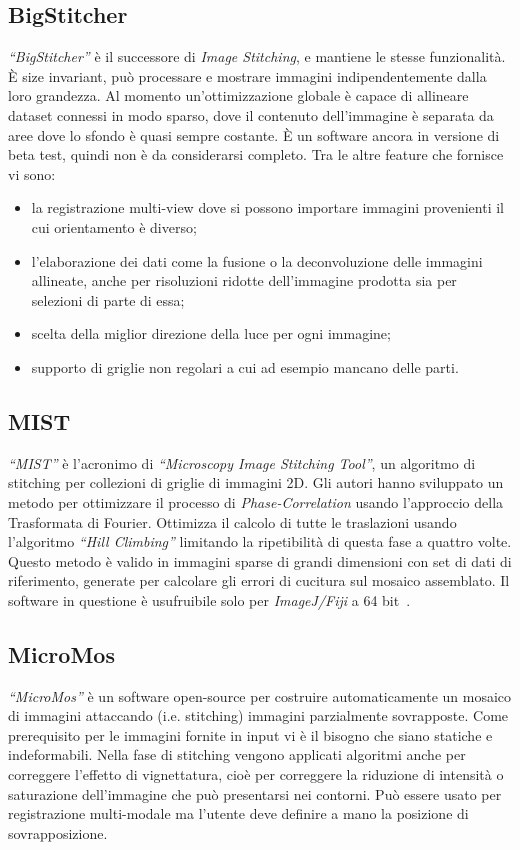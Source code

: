 \subsection{BigStitcher}
\noindent \textit{``BigStitcher''} è il successore di \textit{Image Stitching}, e mantiene le stesse funzionalità. È size invariant, può processare e mostrare immagini indipendentemente dalla loro grandezza. Al momento un'ottimizzazione globale è capace di allineare dataset connessi in modo sparso, dove il contenuto dell'immagine è separata da aree dove lo sfondo è quasi sempre costante. È un software ancora in versione di beta test, quindi non è da considerarsi completo. Tra le altre feature che fornisce vi sono:
\begin{itemize}
    \item la registrazione multi-view dove si possono importare immagini provenienti il cui orientamento è diverso;
    \item l'elaborazione dei dati come la fusione o la deconvoluzione delle immagini allineate, anche per risoluzioni ridotte dell'immagine prodotta sia per selezioni di parte di essa;
    \item scelta della miglior direzione della luce per ogni immagine;
    \item supporto di griglie non regolari a cui ad esempio mancano delle parti.
\end{itemize}

\subsection{MIST}
\noindent \textit{``MIST''} è l'acronimo di \textit{``Microscopy Image Stitching Tool''}, un algoritmo di stitching per collezioni di griglie di immagini 2D. Gli autori hanno sviluppato un metodo per ottimizzare il processo di \textit{Phase-Correlation} usando l'approccio della Trasformata di Fourier. Ottimizza il calcolo di tutte le traslazioni usando l'algoritmo \textit{``Hill Climbing''} limitando la ripetibilità di questa fase a quattro volte. Questo metodo è valido in immagini sparse di grandi dimensioni con set di dati di riferimento, generate per calcolare gli errori di cucitura sul mosaico assemblato. Il software in questione è usufruibile solo per \textit{ImageJ/Fiji} a 64 bit~\cite{MIST}.

\subsection{MicroMos}
\noindent \textit{``MicroMos''} è un software open-source per costruire automaticamente un mosaico di immagini attaccando (i.e. stitching) immagini parzialmente sovrapposte. Come prerequisito per le immagini fornite in input vi è il bisogno che siano statiche e indeformabili. Nella fase di stitching  vengono applicati algoritmi anche per correggere l'effetto di vignettatura, cioè per correggere la riduzione di intensità o saturazione dell'immagine che può presentarsi nei contorni. Può essere usato per registrazione multi-modale ma l’utente deve definire a mano la posizione di sovrapposizione.

